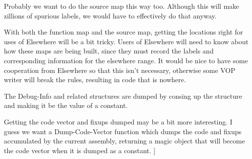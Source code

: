     Probably we want to do the source map this way too.  Although this will
    make zillions of spurious labels, we would have to effectively do that
    anyway.

    With both the function map and the source map, getting the locations right
    for uses of Elsewhere will be a bit tricky.  Users of Elsewhere will need
    to know about how these maps are being built, since they must record the
    labels and corresponding information for the elsewhere range.  It would be
    nice to have some cooperation from Elsewhere so that this isn't necessary,
    otherwise some VOP writer will break the rules, resulting in code that is
    nowhere.

    The Debug-Info and related structures are dumped by consing up the
    structure and making it be the value of a constant.

    Getting the code vector and fixups dumped may be a bit more interesting.  I
    guess we want a Dump-Code-Vector function which dumps the code and fixups
    accumulated by the current assembly, returning a magic object that will
    become the code vector when it is dumped as a constant.
]
